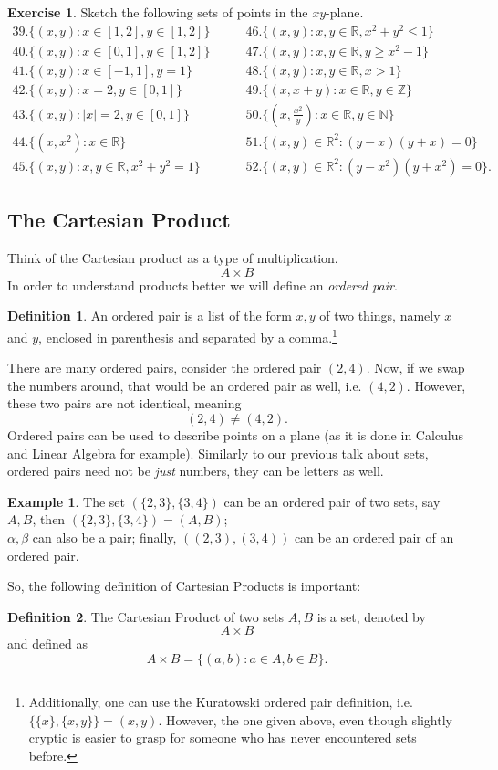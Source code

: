 \documentclass{article}
\theoremstyle{definition}
\newtheorem{example}{Example}[subsection]
\newtheorem{defn}{Definition}[subsection]
\newtheorem{exercise}{Exercise}[section]
\newcommand{\R}{\mathbb{R}}
\newcommand{\N}{\mathbb{N}}
\newcommand{\Z}{\mathbb{Z}}
\begin{document}
\begin{exercise}
    Sketch the following sets of points in the $xy$-plane. 
    $$
    \begin{aligned}
    39. \{ (x,y): x\in[1,2],y\in[1,2] \} &\quad\quad 46. \{ (x,y):x,y\in\R, x^2+y^2\le1 \}\\
    40. \{ (x,y): x\in[0,1],y\in[1,2] \} &\quad\quad 47. \{ (x,y):x,y\in\R,y\ge x^2-1 \}\\
    41. \{ (x,y):x\in[-1,1],y=1 \} &\quad\quad 48. \{ (x,y):x,y\in\R,x>1 \}\\
    42. \{ (x,y): x=2, y\in[0,1] \} &\quad\quad 49. \{ (x,x+y):x\in\R,y\in\Z \}\\
    43. \{ (x,y): \lvert x \rvert=2,y\in[0,1] \} &\quad\quad 50. \{ (x,\frac{x^2}{y}):x\in\R,y\in\N \}\\
    44. \{ (x,x^2):x\in\R \} &\quad\quad 51. \{ (x,y)\in\R^2:(y-x)(y+x)=0 \}\\
    45. \{ (x,y):x,y\in\R,x^2+y^2=1 \} &\quad\quad 52. \{ (x,y)\in\R^2:(y-x^2)(y+x^2)=0 \}.
    \end{aligned}
    $$
\end{exercise}
\subsection{The Cartesian Product}
Think of the Cartesian product as a type of multiplication. 
$$
A \times B 
$$
In order to understand products better we will define an \emph{ordered pair}.
\begin{defn}
An ordered pair is a list of the form $x,y$ of two things, namely $x$ and $y$, enclosed in parenthesis and separated by a comma.\footnote{Additionally, one can use the Kuratowski ordered pair definition, i.e. $\{\{x\}, \{x,y\}\}=(x,y)$. However, the one given above, even though slightly cryptic is easier to grasp for someone who has never encountered sets before.}
\end{defn}

There are many ordered pairs, consider the ordered pair $(2,4)$. Now, if we swap the numbers around, that would be an ordered pair as well, i.e. $(4,2)$. However, these two pairs are not identical, meaning 
$$
(2,4) \ne (4,2).
$$
Ordered pairs can be used to describe points on a plane (as it is done in Calculus and Linear Algebra for example). Similarly to our previous talk about sets, ordered pairs need not be \emph{just} numbers, they can be letters as well. 
\begin{example}
    The set $(\{2,3\}, \{3,4\})$ can be an ordered pair of two sets, say $A,B$, then $(\{2,3\},\{3,4\})=(A,B)$;\\
    $\alpha,\beta$ can also be a pair;
    finally, $((2,3),(3,4))$ can be an ordered pair of an ordered pair. 
\end{example}
So, the following definition of Cartesian Products is important: 
\begin{defn}
    The Cartesian Product of two sets $A,B$ is a set, denoted by 
    $$
    A\times B
    $$
    and defined as 
    $$
    A\times B = \{(a,b): a\in A, b\in B\}.
    $$
\end{defn}
\end{document}
